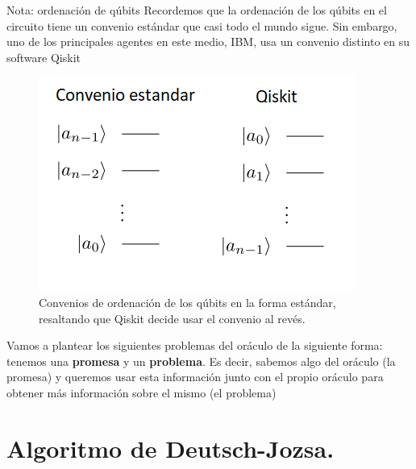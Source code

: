 \documentclass[a4paper,11pt]{book} %
\numberwithin{equation}{chapter}
\begin{document}
	\begin{mybox_blue}{Nota: ordenación de qúbits}
	Recordemos que la ordenación de los qúbits en el circuito tiene un convenio estándar que casi todo el mundo sigue. Sin embargo,
	uno de los principales agentes en este medio, IBM, usa un convenio distinto en su software Qiskit
	\begin{figure}[H]
	\centering 
	\includegraphics[width=0.4\linewidth]{Figuras/Fig_multiqubits_convenios_ordenacion.png}
	\caption{Convenios de ordenación de los qúbits en la forma estándar, resaltando que Qiskit decide usar el convenio al revés.}
	\label{Fig_elementos_convenios_ordenacion}
	\end{figure}
	\end{mybox_blue}
	



Vamos a plantear los siguientes problemas del oráculo de la siguiente forma: tenemos una \textbf{promesa} y un \textbf{problema}. Es decir, sabemos algo del oráculo (la promesa) y queremos usar esta información junto con el propio oráculo para obtener más información sobre el mismo (el problema)


	\section{Algoritmo de Deutsch-Jozsa.}
\end{document}
